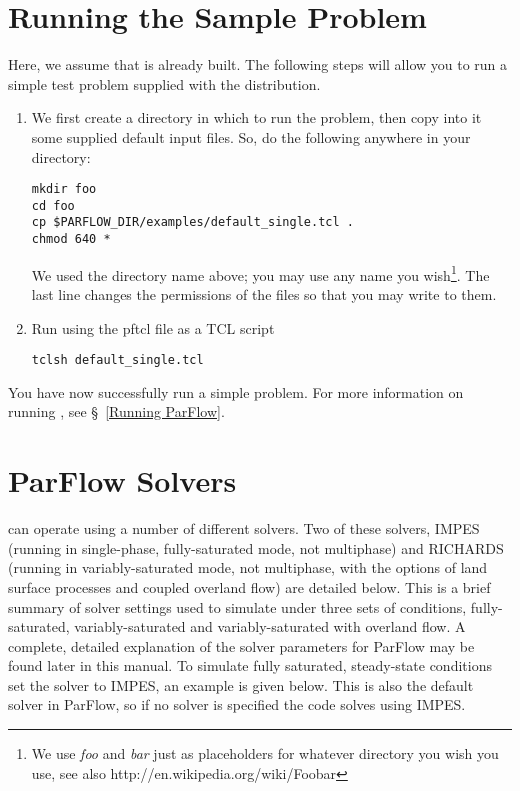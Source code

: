\section{Running the Sample Problem}
\label{Running the Sample Problem}

Here, we assume that \parflow{} is already built.  The following steps
 will allow you to run a simple test problem supplied with the
 distribution.
\begin{enumerate}

\item
We first create a directory in which to run the problem,
then copy into it some supplied default input files.
So, do the following anywhere in your  directory:
\begin{display}\begin{verbatim}
mkdir foo
cd foo
cp $PARFLOW_DIR/examples/default_single.tcl .
chmod 640 *
\end{verbatim}\end{display}
We used the directory name  above;
you may use any name you wish\footnote{We use \emph{foo} and \emph{bar} 
just as placeholders for whatever directory you wish you use, 
see also http://en.wikipedia.org/wiki/Foobar}.
The last line changes the permissions of the files so that
you may write to them.

\item
Run \parflow{} using the pftcl file as a TCL script
\begin{display}\begin{verbatim}
tclsh default_single.tcl
\end{verbatim}\end{display}

\end{enumerate}
You have now successfully run a simple \parflow{} problem.
For more information on running \parflow{},
see \S~\ref{Running ParFlow}.


\section{ParFlow Solvers}
\label{ParFlow Solvers}

\parflow{} can operate using a number of different solvers.  Two of these solvers, 
IMPES (running in single-phase, fully-saturated mode, not multiphase) and RICHARDS 
(running in variably-saturated mode, not multiphase, with the options of land surface
processes and coupled overland flow) are detailed below. 
This is a brief summary of solver settings used to simulate under three sets of conditions, fully-saturated,
variably-saturated and variably-saturated with overland flow.  A complete, detailed explanation of the 
solver parameters for ParFlow may be found later in this manual.
To simulate fully saturated, steady-state conditions set the solver to IMPES, an example is given below. 
This is also the default solver in ParFlow, so if no solver is specified the code solves using IMPES.

